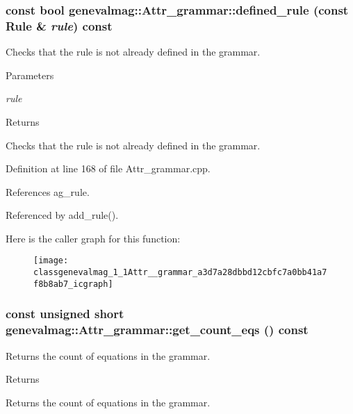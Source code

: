 \hypertarget{classgenevalmag_1_1Attr__grammar_a3d7a28dbbd12cbfc7a0bb41a7f8b8ab7}{
\subsubsection[{defined\_\-rule}]{\setlength{\rightskip}{0pt plus 5cm}const bool genevalmag::Attr\_\-grammar::defined\_\-rule (const {\bf Rule} \& {\em rule}) const}}
\label{classgenevalmag_1_1Attr__grammar_a3d7a28dbbd12cbfc7a0bb41a7f8b8ab7}
Checks that the rule is not already defined in the grammar. 
\begin{DoxyParams}{Parameters}
\item[{\em rule}]\end{DoxyParams}
\begin{DoxyReturn}{Returns}

\end{DoxyReturn}
Checks that the rule is not already defined in the grammar. 

Definition at line 168 of file Attr\_\-grammar.cpp.



References ag\_\-rule.



Referenced by add\_\-rule().



Here is the caller graph for this function:\nopagebreak
\begin{figure}[H]
\begin{center}
\leavevmode
\texttt{[image: classgenevalmag\_1\_1Attr\_\_grammar\_a3d7a28dbbd12cbfc7a0bb41a7f8b8ab7\_icgraph]}
\end{center}
\end{figure}


\hypertarget{classgenevalmag_1_1Attr__grammar_ad94a52850c818a1f74fc81af99b0d52d}{
\subsubsection[{get\_\-count\_\-eqs}]{\setlength{\rightskip}{0pt plus 5cm}const unsigned short genevalmag::Attr\_\-grammar::get\_\-count\_\-eqs () const}}
\label{classgenevalmag_1_1Attr__grammar_ad94a52850c818a1f74fc81af99b0d52d}
Returns the count of equations in the grammar. \begin{DoxyReturn}{Returns}

\end{DoxyReturn}
Returns the count of equations in the grammar. 

